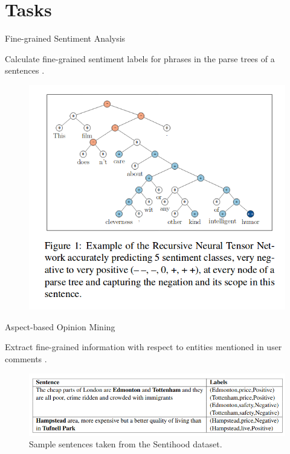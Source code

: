 \documentclass[handout]{beamer}
\begin{document}
\section{Tasks}



\begin{frame}{Fine-grained Sentiment Analysis}

Calculate fine-grained sentiment labels for phrases in the parse trees of a sentences \cite{socher2013recursive}.

    \begin{figure}[h]
        	\includegraphics[scale = 0.3]{pics/recTensor1.png}
        \end{figure}   
 



\end{frame}


\begin{frame}{Aspect-based Opinion Mining}

Extract fine-grained information with respect to entities mentioned in user comments \cite{saeidi-etal-2016-sentihood}.

    \begin{figure}[h]
        	\includegraphics[scale = 0.4]{pics/sentihood.png}
        	
        \caption{Sample sentences taken from the Sentihood dataset.}
        \end{figure} 
 



\end{frame}
\end{document}
